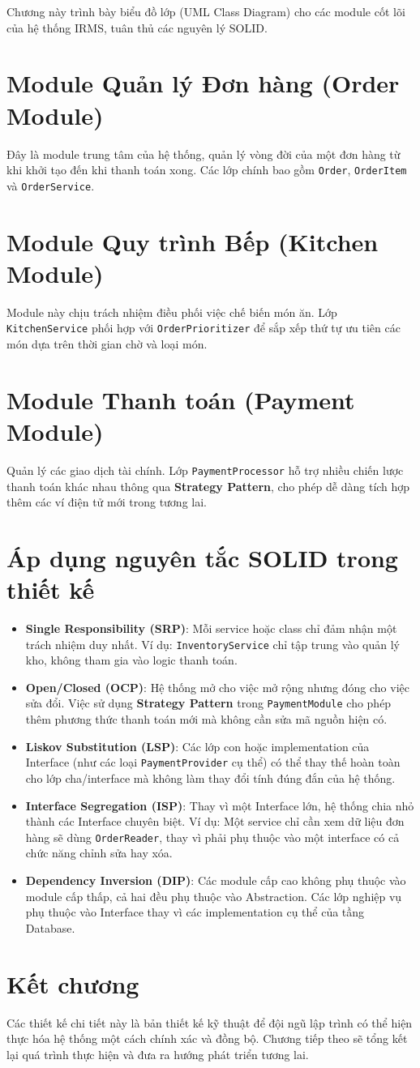 Chương này trình bày biểu đồ lớp (UML Class Diagram) cho các module cốt lõi của hệ thống IRMS, tuân thủ các nguyên lý SOLID.

\section{Module Quản lý Đơn hàng (Order Module)}
Đây là module trung tâm của hệ thống, quản lý vòng đời của một đơn hàng từ khi khởi tạo đến khi thanh toán xong. Các lớp chính bao gồm \texttt{Order}, \texttt{OrderItem} và \texttt{OrderService}.

\section{Module Quy trình Bếp (Kitchen Module)}
Module này chịu trách nhiệm điều phối việc chế biến món ăn. Lớp \texttt{KitchenService} phối hợp với \texttt{OrderPrioritizer} để sắp xếp thứ tự ưu tiên các món dựa trên thời gian chờ và loại món.

\section{Module Thanh toán (Payment Module)}
Quản lý các giao dịch tài chính. Lớp \texttt{PaymentProcessor} hỗ trợ nhiều chiến lược thanh toán khác nhau thông qua \textbf{Strategy Pattern}, cho phép dễ dàng tích hợp thêm các ví điện tử mới trong tương lai.

\section{Áp dụng nguyên tắc SOLID trong thiết kế}
\begin{itemize}
    \item \textbf{Single Responsibility (SRP)}: Mỗi service hoặc class chỉ đảm nhận một trách nhiệm duy nhất. Ví dụ: \texttt{InventoryService} chỉ tập trung vào quản lý kho, không tham gia vào logic thanh toán.
    \item \textbf{Open/Closed (OCP)}: Hệ thống mở cho việc mở rộng nhưng đóng cho việc sửa đổi. Việc sử dụng \textbf{Strategy Pattern} trong \texttt{PaymentModule} cho phép thêm phương thức thanh toán mới mà không cần sửa mã nguồn hiện có.
    \item \textbf{Liskov Substitution (LSP)}: Các lớp con hoặc implementation của Interface (như các loại \texttt{PaymentProvider} cụ thể) có thể thay thế hoàn toàn cho lớp cha/interface mà không làm thay đổi tính đúng đắn của hệ thống.
    \item \textbf{Interface Segregation (ISP)}: Thay vì một Interface lớn, hệ thống chia nhỏ thành các Interface chuyên biệt. Ví dụ: Một service chỉ cần xem dữ liệu đơn hàng sẽ dùng \texttt{OrderReader}, thay vì phải phụ thuộc vào một interface có cả chức năng chỉnh sửa hay xóa.
    \item \textbf{Dependency Inversion (DIP)}: Các module cấp cao không phụ thuộc vào module cấp thấp, cả hai đều phụ thuộc vào Abstraction. Các lớp nghiệp vụ phụ thuộc vào Interface thay vì các implementation cụ thể của tầng Database.
\end{itemize}

\section{Kết chương}
Các thiết kế chi tiết này là bản thiết kế kỹ thuật để đội ngũ lập trình có thể hiện thực hóa hệ thống một cách chính xác và đồng bộ. Chương tiếp theo sẽ tổng kết lại quá trình thực hiện và đưa ra hướng phát triển tương lai.

